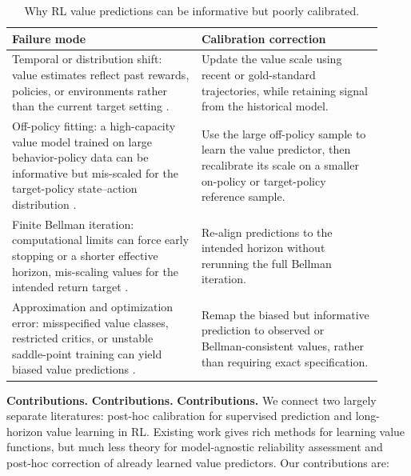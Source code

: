 \documentclass{article}
\theoremstyle{plain}
\theoremstyle{definition}
\theoremstyle{remark}
\begin{document}
\begin{table}[t]
\centering
\small
\setlength{\tabcolsep}{4pt}
\renewcommand{\arraystretch}{1.08}
\caption{Why RL value predictions can be informative but poorly calibrated.}
\label{tab:rl-calibration-motivation}
\begin{tabularx}{\linewidth}{p{0.47\linewidth} p{0.45\linewidth}}
\toprule
\textbf{Failure mode} & \textbf{Calibration correction} \\
\midrule

Temporal or distribution shift: value estimates reflect past rewards, policies,
or environments rather than the current target setting
\citep{kumar2020conservative}.
&
Update the value scale using recent or gold-standard trajectories, while
retaining signal from the historical model.
\\
\midrule

Off-policy fitting: a high-capacity value model trained on large
behavior-policy data can be informative but mis-scaled for the target-policy
state--action distribution \citep{fujimoto2019off}.
&
Use the large off-policy sample to learn the value predictor, then recalibrate its
scale on a smaller on-policy or target-policy reference sample.
\\
\midrule

Finite Bellman iteration: computational limits can force early stopping or a
shorter effective horizon, mis-scaling values for the intended return target
\citep{munos2008finite}.
&
Re-align predictions to the intended horizon without rerunning the full Bellman
iteration.
\\
\midrule

Approximation and optimization error: misspecified value classes, restricted
critics, or unstable saddle-point training can yield biased value predictions
\citep{uehara2021finite}.
&
Remap the biased but informative prediction to observed or Bellman-consistent values,
rather than requiring exact specification.
\\

\bottomrule
\end{tabularx}
\end{table}

\textbf{Contributions.}
\textbf{Contributions.}
\textbf{Contributions.}
We connect two largely separate literatures: post-hoc calibration for
supervised prediction and long-horizon value learning in RL. Existing work gives
rich methods for learning value functions, but much less theory for
model-agnostic reliability assessment and post-hoc correction of already learned
value predictors. Our contributions are:
\end{document}
